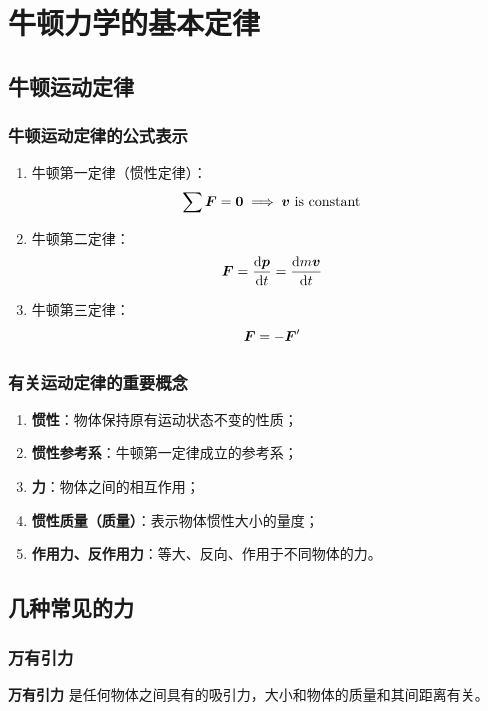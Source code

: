 \section{牛顿力学的基本定律}

\subsection{牛顿运动定律}

\subsubsection{牛顿运动定律的公式表示}

\begin{enumerate}
    \item 牛顿第一定律（惯性定律）：
    $$
    \sum \boldsymbol{F} = \boldsymbol{0} \implies \boldsymbol{v} \text{ is constant}
    $$
    \item 牛顿第二定律：
    $$
    \boldsymbol{F} = \dv{\boldsymbol{p}}{t} = \dv{m \boldsymbol{v}}{t}
    $$
    \item 牛顿第三定律：
    $$
    \boldsymbol{F} = -\boldsymbol{F}'
    $$
\end{enumerate}

\subsubsection{有关运动定律的重要概念}

\begin{enumerate}
    \item \textbf{惯性}：物体保持原有运动状态不变的性质；
    \item \textbf{惯性参考系}：牛顿第一定律成立的参考系；
    \item \textbf{力}：物体之间的相互作用；
    \item \textbf{惯性质量（质量）}：表示物体惯性大小的量度；
    \item \textbf{作用力、反作用力}：等大、反向、作用于不同物体的力。
\end{enumerate}

\subsection{几种常见的力}

\subsubsection{万有引力}

\textbf{万有引力} 是任何物体之间具有的吸引力，大小和物体的质量和其间距离有关。

